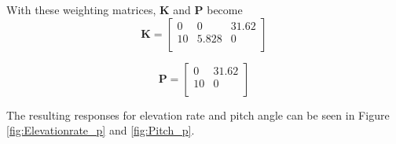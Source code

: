 With these weighting matrices, $\bm{K}$ and $\bm{P}$ become
\begin{equation} \label{eq:K_p}
    \bm{K} = 
	\begin{bmatrix}
		0     & 0     & 31.62\\
		10    & 5.828 & 0    \\
	\end{bmatrix}
\end{equation} 

\begin{equation} \label{eq:P_p}
    \bm{P} = 
	\begin{bmatrix}
		0     & 31.62\\
		10    & 0    \\
	\end{bmatrix}
\end{equation} 

The resulting responses for elevation rate and pitch angle can be seen in Figure \ref{fig:Elevationrate_p} and \ref{fig:Pitch_p}.


